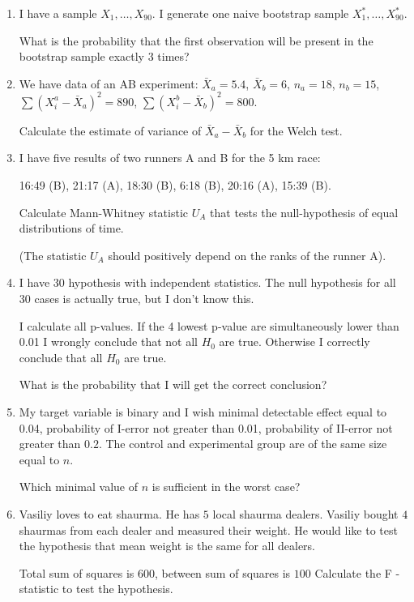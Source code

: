 \documentclass[11pt, a4paper]{article}
\theoremstyle{definition}
\begin{document}
\begin{enumerate}


\item I have a sample \(X_1, \ldots, X_{90}\).
I generate one naive bootstrap sample \(X^*_1, \ldots, X^*_{90}\).
    
What is the probability that the first observation will be present in the bootstrap sample exactly 3 times?
\item  We have data of an AB experiment: \(\bar X_a = 5.4\), \(\bar X_b = 6\),
\(n_a = 18\), \(n_b = 15\), \(\sum (X_i^a - \bar X_a)^2 = 890\),
\(\sum (X_i^b - \bar X_b)^2 = 800\).

Calculate the estimate of variance of \(\bar X_a - \bar X_b\) for the Welch test.

\item I have five results of two runners A and B for the 5 km race:

16:49 (B), 21:17 (A), 18:30 (B), 6:18 (B), 20:16 (A), 15:39 (B).

Calculate Mann-Whitney statistic \(U_A\) that tests the null-hypothesis of equal distributions of time.

(The statistic \(U_A\) should positively depend on the ranks of the runner A).

\item  I have 30 hypothesis with independent statistics. The null hypothesis for all 30
cases is actually true, but I don't know this.

I calculate all p-values.
If the 4 lowest p-value are simultaneously lower than 0.01 I wrongly conclude that not all \(H_0\) are true. 
Otherwise I correctly conclude that all \(H_0\) are true.

What is the probability that I will get the correct conclusion?

\item My target variable is binary and I wish minimal detectable effect equal to 0.04, 
probability of I-error not greater than 0.01, probability of II-error not greater than $0.2$. 
The control and experimental group are of the same size equal to \(n\).

Which minimal value of \(n\) is sufficient in the worst case?

\item Vasiliy loves to eat shaurma. He has \(5\) local shaurma dealers. Vasiliy bought \(4\) shaurmas
from each dealer and measured their weight. He would like to test the hypothesis that mean weight is the
same for all dealers.

Total sum of squares is \(600\), between sum of squares is \(100\)
Calculate the F -statistic to test the hypothesis.

\end{enumerate}
\end{document}
